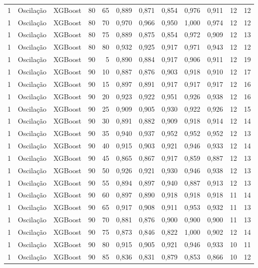 \begin{longtable}{@{}rllrrrrrrrrr@{}}
1 & Oscilação & XGBoost & 80 & 65 & 0,889 & 0,871 & 0,854 & 0,976 & 0,911 & 12 & 12 \\
1 & Oscilação & XGBoost & 80 & 70 & 0,970 & 0,966 & 0,950 & 1,000 & 0,974 & 12 & 12 \\
1 & Oscilação & XGBoost & 80 & 75 & 0,889 & 0,875 & 0,854 & 0,972 & 0,909 & 12 & 13 \\
1 & Oscilação & XGBoost & 80 & 80 & 0,932 & 0,925 & 0,917 & 0,971 & 0,943 & 12 & 12 \\
1 & Oscilação & XGBoost & 90 & 5 & 0,890 & 0,884 & 0,917 & 0,906 & 0,911 & 12 & 19 \\
1 & Oscilação & XGBoost & 90 & 10 & 0,887 & 0,876 & 0,903 & 0,918 & 0,910 & 12 & 17 \\
1 & Oscilação & XGBoost & 90 & 15 & 0,897 & 0,891 & 0,917 & 0,917 & 0,917 & 12 & 16 \\
1 & Oscilação & XGBoost & 90 & 20 & 0,923 & 0,922 & 0,951 & 0,926 & 0,938 & 12 & 16 \\
1 & Oscilação & XGBoost & 90 & 25 & 0,909 & 0,905 & 0,930 & 0,922 & 0,926 & 12 & 15 \\
1 & Oscilação & XGBoost & 90 & 30 & 0,891 & 0,882 & 0,909 & 0,918 & 0,914 & 12 & 14 \\
1 & Oscilação & XGBoost & 90 & 35 & 0,940 & 0,937 & 0,952 & 0,952 & 0,952 & 12 & 13 \\
1 & Oscilação & XGBoost & 90 & 40 & 0,915 & 0,903 & 0,921 & 0,946 & 0,933 & 12 & 14 \\
1 & Oscilação & XGBoost & 90 & 45 & 0,865 & 0,867 & 0,917 & 0,859 & 0,887 & 12 & 13 \\
1 & Oscilação & XGBoost & 90 & 50 & 0,926 & 0,921 & 0,930 & 0,946 & 0,938 & 12 & 13 \\
1 & Oscilação & XGBoost & 90 & 55 & 0,894 & 0,897 & 0,940 & 0,887 & 0,913 & 12 & 13 \\
1 & Oscilação & XGBoost & 90 & 60 & 0,897 & 0,890 & 0,918 & 0,918 & 0,918 & 11 & 14 \\
1 & Oscilação & XGBoost & 90 & 65 & 0,917 & 0,908 & 0,911 & 0,953 & 0,932 & 11 & 13 \\
1 & Oscilação & XGBoost & 90 & 70 & 0,881 & 0,876 & 0,900 & 0,900 & 0,900 & 11 & 13 \\
1 & Oscilação & XGBoost & 90 & 75 & 0,873 & 0,846 & 0,822 & 1,000 & 0,902 & 12 & 14 \\
1 & Oscilação & XGBoost & 90 & 80 & 0,915 & 0,905 & 0,921 & 0,946 & 0,933 & 10 & 11 \\
1 & Oscilação & XGBoost & 90 & 85 & 0,836 & 0,831 & 0,879 & 0,853 & 0,866 & 10 & 12 \\

\end{longtable}
